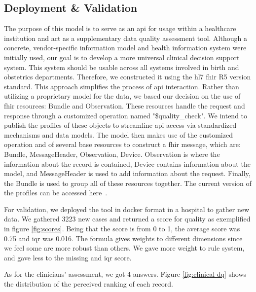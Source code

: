 \subsection{Deployment \& Validation}

The purpose of this model is to serve as an \ac{api} for usage within a healthcare institution and act as a supplementary data quality assessment tool. Although a concrete, vendor-specific information model and health information system were initially used, our goal is to develop a more universal clinical decision support system. This system should be usable across all systems involved in birth and obstetrics departments. Therefore, we constructed it using the \ac{hl7} \ac{fhir} R5 version standard. This approach simplifies the process of \ac{api} interaction. Rather than utilizing a proprietary model for the data, we based our decision on the use of \ac{fhir} resources: Bundle and Observation. These resources handle the request and response through a customized operation named "\$quality\_check". We intend to publish the profiles of these objects to streamline \ac{api} access via standardized mechanisms and data models. The model then makes use of the customized operation and of several base resources to construct a \ac{fhir} message, which are: Bundle, MessageHeader, Observation, Device. Observation is where the information about the record is contained, Device contains information about the model, and MessageHeader is used to add information about the request. Finally, the Bundle is used to group all of these resources together. The current version of the profiles can be accessed here\unskip~\cite{almeidaObstetricsClinicalDecision}. 

For validation, we deployed the tool in docker format in a hospital to gather new data. We gathered 3223 new cases and returned a score for quality as exemplified in figure \ref{fig:scores}. Being that the score is from 0 to 1, the average score was 0.75 and \ac{iqr} was 0.016. The formula gives weights to different dimensions since we feel some are more robust than others. We gave more weight to rule system, and gave less to the missing and \ac{iqr} score.

As for the clinicians' assessment, we got 4 answers. Figure \ref{fig:clinical-dq} shows the distribution of the perceived ranking of each record.


